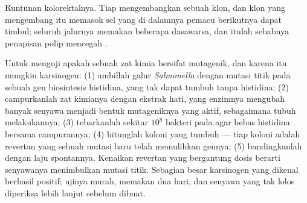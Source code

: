 \begin{omfigure}

{\small Runtunan kolorektalnya. Tiap  mengembangkan sebuah klon,
dan klon yang mengembang itu memasok sel yang di dalamnya pemacu berikutnya
dapat timbul; seluruh jalurnya memakan beberapa dasawarsa, dan itulah sebabnya
penapisan polip mencegah .}
\end{omfigure}

\begin{method}\label{met:b3:cancer-biology:ames}
Untuk menguji apakah sebuah zat kimia bersifat mutagenik, dan karena itu
mungkin karsinogen: (1) ambillah galur \emph{Salmonella} dengan mutasi titik
pada sebuah gen biosintesis histidina, yang tak dapat tumbuh tanpa histidina;
(2) campurkanlah zat kimianya dengan ekstrak hati, yang enzimnya mengubah
banyak senyawa menjadi bentuk mutageniknya yang aktif, sebagaimana tubuh
melakukannya; (3) tebarkanlah sekitar $10^{8}$ bakteri pada agar bebas
histidina bersama campurannya; (4) hitunglah koloni yang tumbuh --- tiap koloni
adalah revertan yang sebuah mutasi baru telah memulihkan gennya; (5)
bandingkanlah dengan laju spontannya. Kenaikan revertan yang bergantung dosis
berarti senyawanya menimbulkan mutasi titik. Sebagian besar karsinogen yang
dikenal berhasil positif; ujinya murah, memakan dua hari, dan senyawa yang tak
lolos diperiksa lebih lanjut sebelum dibuat.
\end{method}

